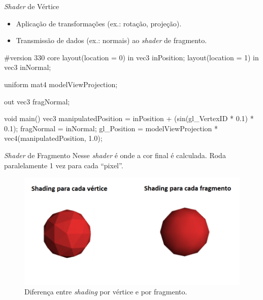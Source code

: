 \begin{frame}[fragile]{\textit{Shader} de Vértice}
    \begin{itemize}
        \item Aplicação de transformações (ex.: rotação, projeção).
        \item Transmissão de dados (ex.: normais) ao \textit{shader} de fragmento.
    \end{itemize}

    \begin{clang}
#version 330 core
layout(location = 0) in vec3 inPosition;
layout(location = 1) in vec3 inNormal;

uniform mat4 modelViewProjection;

out vec3 fragNormal;

void main() {
    vec3 manipulatedPosition = inPosition + (sin(gl_VertexID * 0.1) * 0.1);
    fragNormal = inNormal;
    gl_Position = modelViewProjection * vec4(manipulatedPosition, 1.0);
}
    \end{clang}
\end{frame}

\begin{frame}{\textit{Shader} de Fragmento}
    Nesse \textit{shader} é onde a cor final é calculada. Roda paralelamente 1 vez para cada ``pixel''.
    \begin{figure}[H]
        \centering
        \includegraphics[scale=0.5]{./Imagens/per_vertex_per_frag.png}
        \caption{\small Diferença entre \textit{shading} por vértice e por fragmento.}
    \end{figure}
\end{frame}


